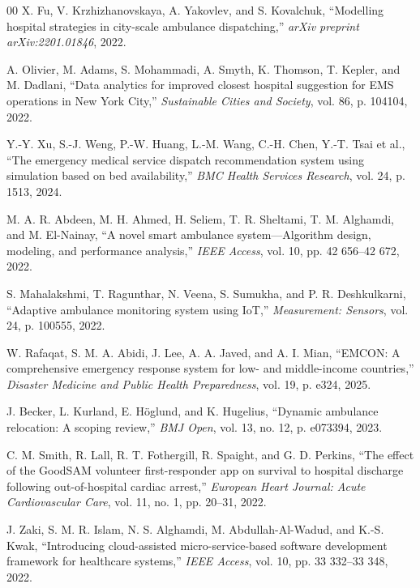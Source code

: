 \documentclass[conference]{IEEEtran}
\begin{document}
\begin{thebibliography}{00}
 X. Fu, V. Krzhizhanovskaya, A. Yakovlev, and S. Kovalchuk, ``Modelling hospital strategies in city-scale ambulance dispatching,'' \textit{arXiv preprint arXiv:2201.01846}, 2022.

 A. Olivier, M. Adams, S. Mohammadi, A. Smyth, K. Thomson, T. Kepler, and M. Dadlani, ``Data analytics for improved closest hospital suggestion for EMS operations in New York City,'' \textit{Sustainable Cities and Society}, vol. 86, p. 104104, 2022.

 Y.-Y. Xu, S.-J. Weng, P.-W. Huang, L.-M. Wang, C.-H. Chen, Y.-T. Tsai et al., ``The emergency medical service dispatch recommendation system using simulation based on bed availability,'' \textit{BMC Health Services Research}, vol. 24, p. 1513, 2024.

 M. A. R. Abdeen, M. H. Ahmed, H. Seliem, T. R. Sheltami, T. M. Alghamdi, and M. El-Nainay, ``A novel smart ambulance system—Algorithm design, modeling, and performance analysis,'' \textit{IEEE Access}, vol. 10, pp. 42 656--42 672, 2022.

 S. Mahalakshmi, T. Ragunthar, N. Veena, S. Sumukha, and P. R. Deshkulkarni, ``Adaptive ambulance monitoring system using IoT,'' \textit{Measurement: Sensors}, vol. 24, p. 100555, 2022.

 W. Rafaqat, S. M. A. Abidi, J. Lee, A. A. Javed, and A. I. Mian, ``EMCON: A comprehensive emergency response system for low- and middle-income countries,'' \textit{Disaster Medicine and Public Health Preparedness}, vol. 19, p. e324, 2025.

 J. Becker, L. Kurland, E. H{\"o}glund, and K. Hugelius, ``Dynamic ambulance relocation: A scoping review,'' \textit{BMJ Open}, vol. 13, no. 12, p. e073394, 2023.

 C. M. Smith, R. Lall, R. T. Fothergill, R. Spaight, and G. D. Perkins, ``The effect of the GoodSAM volunteer first-responder app on survival to hospital discharge following out-of-hospital cardiac arrest,'' \textit{European Heart Journal: Acute Cardiovascular Care}, vol. 11, no. 1, pp. 20--31, 2022.

 J. Zaki, S. M. R. Islam, N. S. Alghamdi, M. Abdullah-Al-Wadud, and K.-S. Kwak, ``Introducing cloud-assisted micro-service-based software development framework for healthcare systems,'' \textit{IEEE Access}, vol. 10, pp. 33 332--33 348, 2022.


\end{thebibliography}
\end{document}

